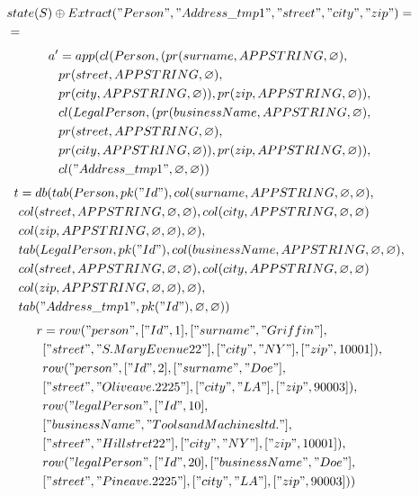 \documentclass[11pt]{article}
\begin{document}
\begin{align*}
& state(S) \oplus Extract("Person", "Address\_tmp1", "street", "city", "zip") = \\
&=
\end{align*}
\hline
\begin{align*}
a' &= app(cl(Person, (pr(surname, APPSTRING, \varnothing), \\
& pr(street, APPSTRING, \varnothing), \\
& pr(city, APPSTRING, \varnothing)), pr(zip, APPSTRING, \varnothing)), \\
& cl(LegalPerson, (pr(businessName, APPSTRING, \varnothing), \\
& pr(street, APPSTRING, \varnothing), \\
& pr(city, APPSTRING, \varnothing)), pr(zip, APPSTRING, \varnothing)),\\
& cl("Address\_tmp1", \varnothing, \varnothing)
 )
\end{align*}
\begin{align*}
t &= db(tab(Person, pk("Id"), col(surname, APPSTRING, \varnothing, \varnothing), \\
& col(street, APPSTRING, \varnothing, \varnothing), col(city, APPSTRING, \varnothing, \varnothing) \\
& col(zip, APPSTRING, \varnothing, \varnothing), \varnothing), \\
& tab(LegalPerson, pk("Id"),  col(businessName, APPSTRING, \varnothing, \varnothing), \\
& col(street, APPSTRING, \varnothing, \varnothing), col(city, APPSTRING, \varnothing, \varnothing) \\
& col(zip, APPSTRING, \varnothing, \varnothing), \varnothing), \\
& tab("Address\_tmp1", pk("Id"), \varnothing, \varnothing)) 
\end{align*}
\begin{align*}
r &= row("person", ["Id", 1], ["surname", "Griffin"], \\
& ["street", "S. Mary Evenue 22"], ["city", "NY"], ["zip", 10001]), \\
& row("person", ["Id", 2], ["surname", "Doe"], \\
& ["street", "Olive ave. 2225"], ["city", "LA"], ["zip", 90003]), \\
& row("legalPerson", ["Id", 10], \\
& ["businessName", "Tools and Machines ltd."], \\
& ["street", "Hill stret 22"], ["city", "NY"], ["zip", 10001]), \\
& row("legalPerson", ["Id", 20], ["businessName", "Doe"], \\
& ["street", "Pine ave. 2225"], ["city", "LA"], ["zip", 90003]))
\end{align*}
\end{document}
